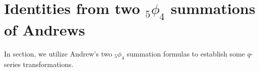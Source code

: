 \documentclass[reqno,12pt]{amsart}
\newtheorem{theorem}{Theorem}[section]%
\theoremstyle{remark}
\numberwithin{equation}{section}
\begin{document}
\section{Identities from two ${_5\phi_4}$ summations of Andrews}\label{sec7}
In section, we utilize Andrew's  two ${_5\phi_4}$ summation formulas to establish some $q$-series transformations.

\end{document}
